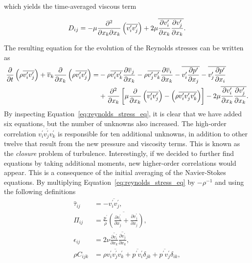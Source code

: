 which yields the time-averaged viscous term
\begin{eqBox}
\begin{equation}
	D_{ij} = -
	\mu \frac{\partial^2}{\partial x_k \partial x_k} \left(\overline{v_i^\prime v_j^\prime}\right) 
	+ 2 \mu \overline{\frac{\partial v_{i\vphantom{j}}^\prime}{\partial x_k}\frac{\partial v_j^\prime}{\partial x_k}}.
\end{equation}
\end{eqBox}
The resulting equation for the evolution of the Reynolds stresses can be written as
\begin{equation}
	\begin{aligned}
	\frac{\partial}{\partial t} \left(\rho \overline{v_i^\prime v_j^\prime}\right) 
	+ \overline v_k \frac{\partial}{\partial x_k} \left(\rho \overline{v_i^\prime v_j^\prime}\right) 
	=&
	- \rho \overline{v_i^\prime v_k^\prime}\frac{\partial \overline v_j }{\partial x_k}
	- \rho \overline{v_j^\prime v_k^\prime}\frac{\partial \overline v_{i\vphantom{j}}}{\partial x_k}
	- \overline{v_i^\prime \frac{\partial p^\prime}{\partial x_j}}
	- \overline{v_j^\prime \frac{\partial p^\prime}{\partial x_i}}  \\
	&+ \frac{\partial^2}{\partial x_k}  
	\left[
		\mu \frac{\partial}{\partial x_k} \left(\overline{v_i^\prime v_j^\prime}\right)
		- \left(\rho\overline{v_i^\prime v_j^\prime v_k^\prime }\right) 
	\right]
	- 2 \mu \overline{\frac{\partial v_{i\vphantom{j}}^\prime}{\partial x_k}\frac{\partial v_j^\prime}{\partial x_k}}.
	\end{aligned}
	\label{eq:reynolds_stress_eq}
\end{equation}
By inspecting Equation~\ref{eq:reynolds_stress_eq}, it is clear that we have added six equations, but the number of unknowns also increased. The high-order correlation $\overline{v_i^\prime v_j^\prime v_k^\prime}$ is responsible for ten additional unknowns, in addition to other twelve that result from the new pressure and viscosity terms. This is known as the \textit{closure} problem of turbulence. Interestingly, if we decided to further find equations by taking additional moments, new higher-order correlations would appear. This is a consequence of the initial averaging of the Navier-Stokes equations. By multiplying Equation~\ref{eq:reynolds_stress_eq} by $-\rho^{-1}$ and using the following definitions
\begin{align}
	\hat\tau_{ij} &= -\overline{v_i^\prime v_j^\prime},\\
	\Pi_{ij} &= \overline{\frac{p^\prime}{\rho} \left(\frac{\partial v_i^\prime}{\partial x_j} + \frac{\partial v_j^\prime}{\partial x_j} \right)}, \\
	\epsilon_{ij} &= 2\nu \overline{\frac{\partial v_i^\prime}{\partial x_k}}\overline{\frac{\partial v_j^\prime}{\partial x_k}},\\
	\rho C_{ijk} &= \rho \overline{v_i^\prime v_j^\prime v_k^\prime} + \overline{p^\prime v_i^\prime}\delta_{jk} + \overline{p^\prime v_j^\prime}\delta_{ik},
\end{align}
